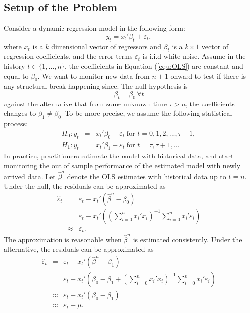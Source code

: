 \documentclass[preprint,authoryear,12pt,english]{elsarticle}
\theoremstyle{plain}
\begin{document}
\subsection{Setup of the Problem}
Consider a dynamic regression model in the following form:
\begin{equation}
    y_{t} = x_{t}'\beta_{t} + \varepsilon_{t}\label{equ:OLS},
\end{equation}
where $x_{t}$ is a $k$ dimensional vector of regressors and $\beta_{t}$ is a $k\times 1$ vector of regression coefficients, and the error terms $\varepsilon_{t}$ is i.i.d white noise. Assume in the history $t \in \{ 1,...,n \}$, the coefficients in Equation (\ref{equ:OLS}) are constant and equal to $\beta_{0}$. We want to monitor new data from $n+1$ onward to test if there is any structural break happening since. The null hypothesis is
\begin{equation}
    \beta_{t} = \beta_{0} \, \forall t
\end{equation}
against the alternative that from some unknown time $\tau>n$, the coefficients changes to $\beta_{1} \neq \beta_{0}$. To be more precise, we assume the following statistical process:
\begin{eqnarray*}
    H_{0}: y_{t} &=& x_{t}'\beta_{0} + \varepsilon_{t} \text{ for } t = 0,1,2,...,\tau-1,\\
    H_{1}: y_{t} &=& x_{t}'\beta_{1} + \varepsilon_{t} \text{ for } t = \tau, \tau+1,...
\end{eqnarray*}
In practice, practitioners estimate the model with historical data, and start monitoring the out of sample performance of the estimated model with newly arrived data. Let $\hat{\beta}^{n}$ denote the OLS estimates with historical data up to $t=n$. Under the null, the residuals can be approximated as
\begin{eqnarray*}
    \hat{\varepsilon}_{t} &=&  \varepsilon_{t} - x_{t}'(\hat{\beta}^{n} - \beta_{0})\\
    &=& \varepsilon_{t}-x_{t}'((\sum_{i=0}^{n}x_{i}'x_{i})^{-1}\sum_{i=0}^{n}x_{i}'\varepsilon_{i})\\
    &\approx& \varepsilon_{t}.
\end{eqnarray*}
The approximation is reasonable when $\hat{\beta}^{n}$ is estimated consistently. Under the alternative, the residuals can be approximated as
\begin{eqnarray*}
    \hat{\varepsilon}_{t} &=&  \varepsilon_{t} - x_{t}'(\hat{\beta}^{n} - \beta_{1})\\
    &=& \varepsilon_{t} - x_{t}'(\beta_{0} -\beta_{1}+(\sum_{i=0}^{n}x_{i}'x_{i})^{-1}\sum_{i=0}^{n}x_{i}'\varepsilon_{i})\\
    &\approx& \varepsilon_{t} - x_{t}'(\beta_{0}-\beta_{1})\\
    &\approx& \varepsilon_{t} - \mu.
\end{eqnarray*}
\end{document}
